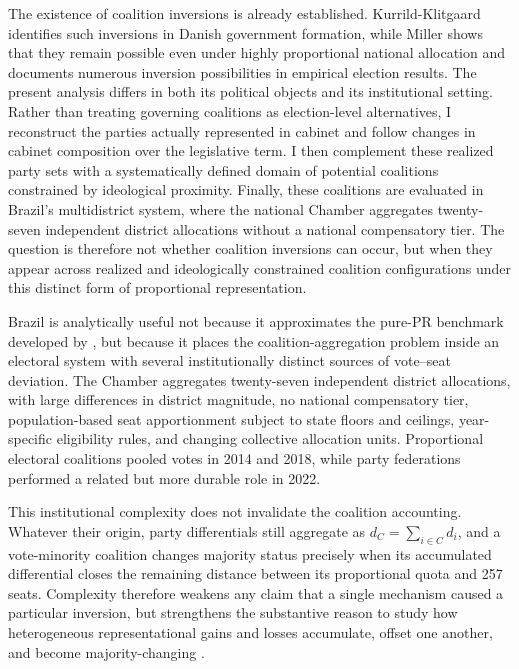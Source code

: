 \documentclass[11pt]{article}
\begin{document}
The existence of coalition inversions is already established.
Kurrild-Klitgaard
\parencite{kurrild-klitgaard13_elect_inver_coalit_propor_repres} identifies
such inversions in Danish government formation, while Miller
\parencite{miller14_elect_inver_under_propor_repres} shows that they remain
possible even under highly proportional national allocation and documents
numerous inversion possibilities in empirical election results. The present
analysis differs in both its political objects and its institutional setting.
Rather than treating governing coalitions as election-level alternatives, I
reconstruct the parties actually represented in cabinet and follow changes in
cabinet composition over the legislative term. I then complement these realized
party sets with a systematically defined domain of potential coalitions
constrained by ideological proximity. Finally, these coalitions are evaluated in
Brazil's multidistrict system, where the national Chamber aggregates
twenty-seven independent district allocations without a national compensatory
tier. The question is therefore not whether coalition inversions can occur, but
when they appear across realized and ideologically constrained coalition
configurations under this distinct form of proportional representation.


Brazil is analytically useful not because it approximates the pure-PR
benchmark developed by \textcite{miller14_elect_inver_under_propor_repres},
but because it places the coalition-aggregation problem inside an electoral
system with several institutionally distinct sources of vote--seat deviation.
The Chamber aggregates twenty-seven independent district allocations, with
large differences in district magnitude, no national compensatory tier,
population-based seat apportionment subject to state floors and ceilings,
year-specific eligibility rules, and changing collective allocation units.
Proportional electoral coalitions pooled votes in 2014 and 2018, while party
federations performed a related but more durable role in 2022.

This institutional complexity does not invalidate the coalition accounting.
Whatever their origin, party differentials still aggregate as
\(d_C=\sum_{i\in C}d_i\), and a vote-minority coalition changes majority
status precisely when its accumulated differential closes the remaining
distance between its proportional quota and 257 seats. Complexity therefore
weakens any claim that a single mechanism caused a particular inversion, but
strengthens the substantive reason to study how heterogeneous
representational gains and losses accumulate, offset one another, and become
majority-changing \parencite{bochsler2026winners}.
\end{document}
